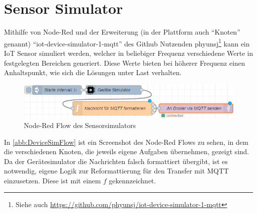 
\section{Sensor Simulator}\label{chap:iotdevicesim}
Mithilfe von Node-Red und der Erweiterung (in der Plattform auch \enquote{Knoten} genannt) \enquote{iot-device-simulator-1-mqtt} des Github Nutzenden phyunsj\footnote{Siehe auch \url{https://github.com/phyunsj/iot-device-simulator-1-mqtt}} kann ein \ac{IoT} Sensor simuliert werden, welcher in beliebiger Frequenz verschiedene Werte in festgelegten Bereichen generiert. Diese Werte bieten bei höherer Frequenz einen Anhaltspunkt, wie sich die Lösungen unter Last verhalten.
\begin{figure}[H]
\centering
\includegraphics[width=\textwidth]{graphics/Device-Simulator-Flow.png}
\caption{Node-Red Flow des Sensorsimulators}
\label{abb:DeviceSimFlow}
\end{figure}

In \autoref{abb:DeviceSimFlow} ist ein Screenshot des Node-Red Flows zu sehen, in dem die verschiedenen Knoten, die jeweils eigene Aufgaben übernehmen, gezeigt sind. Da der Gerätesimulator die Nachrichten falsch formattiert übergibt, ist es notwendig, eigene Logik zur Reformattierung für den Transfer mit \ac{MQTT} einzusetzen. Diese ist mit einem $f$ gekennzeichnet.


